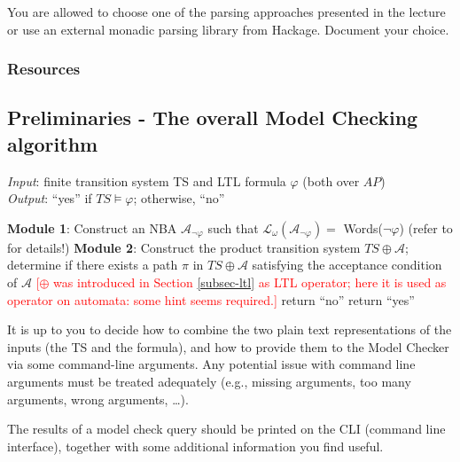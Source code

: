 \documentclass{article}
\begin{document}
You are allowed to choose one of the parsing approaches presented in the lecture or 
use an external monadic parsing library from Hackage. Document your choice.

\subsubsection*{Resources}
\cite[Paragraph 5.1 (in particular 5.1.1 and 5.1.2)]{BaKa}

\subsection{Preliminaries - The overall Model Checking algorithm}
\label{subsec-mca}
\begin{algorithm}[H]
    \caption{Automaton Based LTL Model Checking}
    \label{alg:mc}
    \hspace*{\algorithmicindent} \emph{Input}: finite transition system TS and LTL formula $\varphi$ (both over $AP$) \\
    \hspace*{\algorithmicindent} \emph{Output}: ``yes'' if $TS \vDash \varphi$; otherwise, ``no''
    \begin{algorithmic}[1]
    \State \textbf{Module 1}: Construct an NBA $\mathcal{A}_{\neg \varphi}$ such that $\mathcal{L}_{\omega}(\mathcal{A}_{\neg \varphi}) = $ Words($\neg \varphi$) (refer to \cite{BaKa} for details!)
    \State \textbf{Module 2}: Construct the product transition system $TS \oplus \mathcal{A}$; determine if there exists 
                a path $\pi$ in $TS \oplus \mathcal{A}$ satisfying the acceptance condition of $\mathcal{A}$
            \textcolor{red}{[$\oplus$ was introduced in Section \ref{subsec-ltl} as LTL operator; here it is
            used as operator on automata: some hint seems required.]}
        \State return ``no'' 
    \Else 
        \State return ``yes''
    \EndIf
    \end{algorithmic}
\end{algorithm}
  
It is up to you to decide how to combine the two plain text representations of the inputs (the TS and the formula), 
and how to provide them to the Model Checker via some command-line arguments. Any potential issue with 
command line arguments must be treated adequately (e.g., missing arguments, too many arguments, wrong arguments, \dots).

The results of a model check query should be printed on the CLI (command line interface), together with some additional 
information you find useful.
\end{document}
